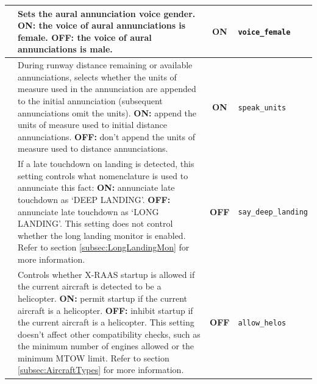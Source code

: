 \documentclass[a4paper,12pt]{article}
\newcommand{\confopt}[1]{\texttt{#1}}
\begin{document}
{\begin{center}
\begin{supertabular}{|c|p{8cm}|c|l|}
\hline

 &
Sets the aural annunciation voice gender.\newline
\textbf{ON:} the voice of aural annunciations is female.\newline
\textbf{OFF:} the voice of aural annunciations is male. &
\textbf{ON} & \confopt{voice\_female} \\

\hline

 &
During runway distance remaining or available annunciations, selects
whether the units of measure used in the annunciation are appended to the
initial annunciation (subsequent annunciations omit the units).\newline
\textbf{ON:} append the units of measure used to initial distance
annunciations.\newline
\textbf{OFF:} don't append the units of measure used to distance
annunciations. & \textbf{ON} & \confopt{speak\_units} \\

\hline

 &
If a late touchdown on landing is detected, this setting controls what
nomenclature is used to annunciate this fact:\newline
\textbf{ON:} annunciate late touchdown as `DEEP LANDING'.\newline
\textbf{OFF:} annunciate late touchdown as `LONG LANDING'.\newline
This setting does not control whether the long landing monitor is
enabled. Refer to section \ref{subsec:LongLandingMon} for more information. &
\textbf{OFF} & \confopt{say\_deep\_landing} \\

\hline

 &

Controls whether X-RAAS startup is allowed if the current aircraft is
detected to be a helicopter.\newline
\textbf{ON:} permit startup if the current aircraft is a helicopter.\newline
\textbf{OFF:} inhibit startup if the current aircraft is a helicopter.\newline
This setting doesn't affect other compatibility checks, such as the
minimum number of engines allowed or the minimum MTOW limit. Refer to
section \ref{subsec:AircraftTypes} for more information. & \textbf{OFF} &
\confopt{allow\_helos} \\


\end{supertabular}
\end{center}}
\end{document}
